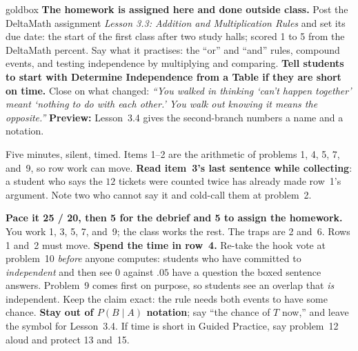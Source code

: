 \documentclass[10pt]{article}
\begin{document}
\boxguard
\begin{skillbox}{goldbox}
\textbf{The homework is assigned here and done outside class.} Post the DeltaMath assignment
\emph{Lesson 3.3: Addition and Multiplication Rules} and set its due date: the start of the first
class after two study halls; scored 1 to 5 from the DeltaMath percent. Say what it practises:
the ``or'' and ``and'' rules, compound events, and testing independence by multiplying and
comparing. \textbf{Tell students to start with Determine Independence from a Table if they are
short on time.} Close on what changed: \emph{``You walked in thinking `can't happen
together' meant `nothing to do with each other.' You walk out knowing it means the opposite.''}
\textbf{Preview:} Lesson~3.4 gives the second-branch numbers a name and a notation.
\end{skillbox}

\begin{teachernote}[Warm-Up]
Five minutes, silent, timed. Items 1--2 are the arithmetic of problems 1, 4, 5, 7, and~9, so row
work can move. \textbf{Read item~3's last sentence while collecting}: a student who says the
$12$ tickets were counted twice has already made row~1's argument. Note two who cannot say it
and cold-call them at problem~2.
\end{teachernote}

\begin{teachernote}
\textbf{Pace it 25 / 20, then 5 for the debrief and 5 to assign the homework.} You work 1, 3, 5,
7, and~9; the class works the rest. The traps are 2 and~6. Rows 1 and~2 must move.
\textbf{Spend the time in row~4.} Re-take the hook vote at problem~10 \emph{before} anyone
computes: students who have committed to \emph{independent} and then see $0$ against $.05$ have
a question the boxed sentence answers. Problem~9 comes first on purpose, so students see an
overlap that \emph{is} independent. Keep the claim exact: the rule needs both events to have some
chance. \textbf{Stay out of $P(B \mid A)$ notation}; say ``the chance of $T$ now,'' and leave the
symbol for Lesson~3.4. If time is short in Guided Practice, say problem~12 aloud and protect 13
and~15.
\end{teachernote}
\end{document}
